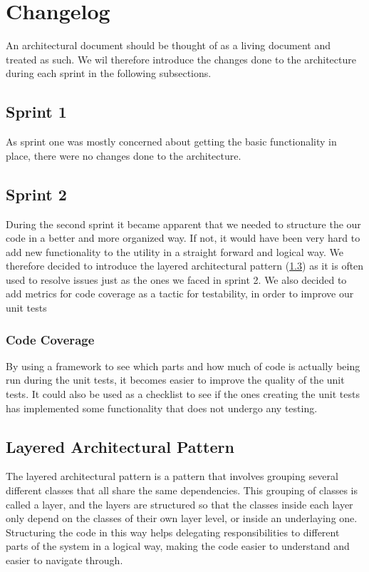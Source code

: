 \section{Changelog}
 An architectural document should be thought of as a living document and treated as such. We wil therefore introduce the changes done to the architecture during each sprint in the following subsections.

\subsection{Sprint 1}
As sprint one was mostly concerned about getting the basic functionality in place, there were no changes done to the architecture.

\subsection{Sprint 2}
During the second sprint it became apparent that we needed to structure the our code in a better and more organized way. If not, it would have been very hard to add new functionality to the utility in a straight forward and logical way. We therefore decided to introduce the layered architectural pattern (\ref{sec:Layered}) as it is often used to resolve issues just as the ones we faced in sprint 2. We also decided to add metrics for code coverage as a tactic for testability, in order to improve our unit tests

\subsubsection{Code Coverage}
By using a framework to see which parts and how much of code is actually being run during the unit tests, it becomes easier to improve the quality of the unit tests. It could also be used as a checklist to see if the ones creating the unit tests has implemented some functionality that does not undergo any testing.


\subsection{Layered Architectural Pattern}
\label{sec:Layered}
The layered architectural pattern is a pattern that involves grouping several different classes that all share the same dependencies. This grouping of classes is called a layer, and the layers are structured so that the classes inside each layer only depend on the classes of their own layer level, or inside an underlaying one. Structuring the code in this way helps delegating responsibilities to different parts of the system in a logical way, making the code easier to understand and easier to navigate through.

